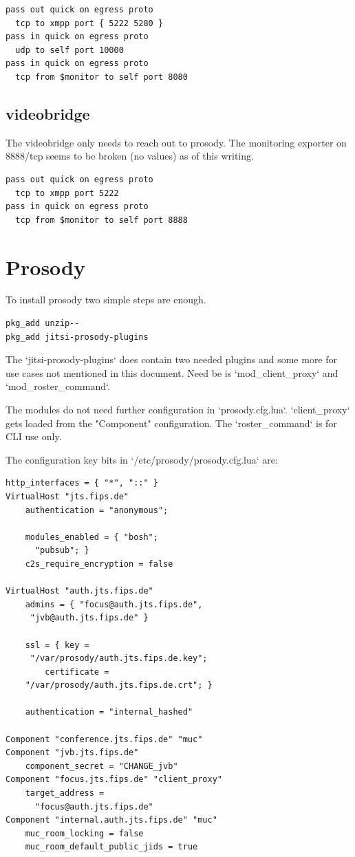 \documentclass[10pt,conference]{IEEEtran}
\begin{document}
\begin{verbatim}
pass out quick on egress proto
  tcp to xmpp port { 5222 5280 }
pass in quick on egress proto
  udp to self port 10000
pass in quick on egress proto
  tcp from $monitor to self port 8080
\end{verbatim}

\subsection{videobridge}
The videobridge only needs to reach out to prosody. The monitoring exporter on 8888/tcp
seems to be broken (no values) as of this writing.
\begin{verbatim}
pass out quick on egress proto
  tcp to xmpp port 5222
pass in quick on egress proto
  tcp from $monitor to self port 8888
\end{verbatim}

\section{Prosody}
To install prosody two simple steps are enough.

\begin{verbatim}
pkg_add unzip--
pkg_add jitsi-prosody-plugins
\end{verbatim}

The `jitsi-prosody-plugins` does contain two needed plugins and some more for use
cases not mentioned in this document. Need be is `mod_client_proxy` and `mod_roster_command`.

The modules do not need further configuration in `prosody.cfg.lua`.
`client_proxy` gets loaded from the "Component" configuration.
The `roster_command` is for CLI use only.

The configuration key bits in `/etc/prosody/prosody.cfg.lua` are:

\begin{verbatim}
http_interfaces = { "*", "::" }
VirtualHost "jts.fips.de"
    authentication = "anonymous";

    modules_enabled = { "bosh";
      "pubsub"; }
    c2s_require_encryption = false

VirtualHost "auth.jts.fips.de"
    admins = { "focus@auth.jts.fips.de",
     "jvb@auth.jts.fips.de" }

    ssl = { key =
     "/var/prosody/auth.jts.fips.de.key";
        certificate =
    "/var/prosody/auth.jts.fips.de.crt"; }

    authentication = "internal_hashed"

Component "conference.jts.fips.de" "muc"
Component "jvb.jts.fips.de"
    component_secret = "CHANGE_jvb"
Component "focus.jts.fips.de" "client_proxy"
    target_address =
      "focus@auth.jts.fips.de"
Component "internal.auth.jts.fips.de" "muc"
    muc_room_locking = false
    muc_room_default_public_jids = true
\end{verbatim}
\end{document}

